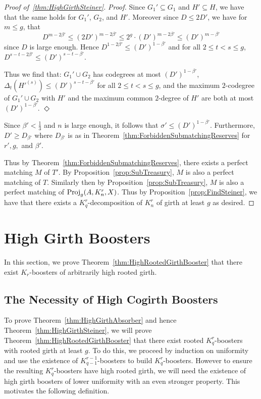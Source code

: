\documentclass[11pt]{article}
\newcounter{i}
\theoremstyle{plain}
\newenvironment{proofclaim}[1][]%
{\noindent \emph{Proof.} {}{#1}{}}{\hfill
	$\Diamond$\vspace{1em}}
\renewcommand{\theclaim}{\thetheorem.\arabic{claim}}
\newenvironment{lateproof}[1]
 {%
  \renewcommand{\theclaim}{\ref{#1}.\arabic{claim}}%
  \begin{proof}[Proof of~\cref{#1}]%
 }
 {\end{proof}}
\theoremstyle{plain} %
\theoremstyle{definition}
\begin{document}
\begin{lateproof}{thm:HighGirthSteiner}
\begin{proofclaim}
Since $G_1'\subseteq G_1$ and $H'\subseteq H$, we have that the same holds for $G_1'$, $G_2$, and $H'$. Moreover since $D\le 2D'$, we have for $m\le g$, that 
$$D^{m-2\beta'} \le (2D')^{m-2\beta'} \le 2^g \cdot (D')^{m-2\beta'} \le (D')^{m-\beta'}$$
since $D$ is large enough. Hence $D^{1-2\beta'}\le (D')^{1-\beta'}$ and for all $2\le t< s\le g$, $D^{s-t-2\beta'}\le (D')^{s-t-\beta'}$. 

Thus we find that: $G_1'\cup G_2$ has codegrees at most $(D')^{1-\beta'}$, $\Delta_{t}(H'^{(s)}) \le (D')^{s-t-\beta'}$ for all $2\le t< s\le g$, and the maximum $2$-codegree of $G_1'\cup G_2$ with $H'$ and the maximum common $2$-degree of $H'$ are both at most $(D')^{1-\beta'}$.
\end{proofclaim}
 
Since $\beta' < \frac{1}{3}$ and $n$ is large enough, it follows that $\sigma' \le (D')^{1-\beta'}$. Furthermore, $D'\ge D_{\beta'}$ where $D_{\beta'}$ is as in Theorem~\ref{thm:ForbiddenSubmatchingReserves} for $r',g,$ and $\beta'$.

Thus by Theorem~\ref{thm:ForbiddenSubmatchingReserves}, there exists a perfect matching $M$ of $T'$. By Proposition~\ref{prop:SubTreasury}, $M$ is also a perfect matching of $T$. Similarly then by Proposition~\ref{prop:SubTreasury}, $M$ is also a perfect matching of ${\rm Proj}_g(A, K_n^r, X)$. Thus by Proposition~\ref{prop:FindSteiner}, we have that there exists a $K_q^r$-decomposition of $K_n^r$ of girth at least $g$ as desired.
\end{lateproof}

\section{High Girth Boosters}\label{s:GirthBoosters}

In this section, we prove  Theorem~\ref{thm:HighRootedGirthBooster} that there exist $K_r$-boosters of arbitrarily high rooted girth. 

\subsection{The Necessity of High Cogirth Boosters}

To prove Theorem~\ref{thm:HighGirthAbsorber} and hence Theorem~\ref{thm:HighGirthSteiner}, we will prove Theorem~\ref{thm:HighRootedGirthBooster} that there exist rooted $K_q^r$-boosters with rooted girth at least $g$. To do this, we proceed by induction on uniformity and use the existence of $K_{q-1}^{r-1}$-boosters to build $K_q^r$-boosters. However to ensure the resulting $K_q^r$-boosters have high rooted girth, we will need the existence of high girth boosters of lower uniformity with an even stronger property. This motivates the following definition.
\end{document}
